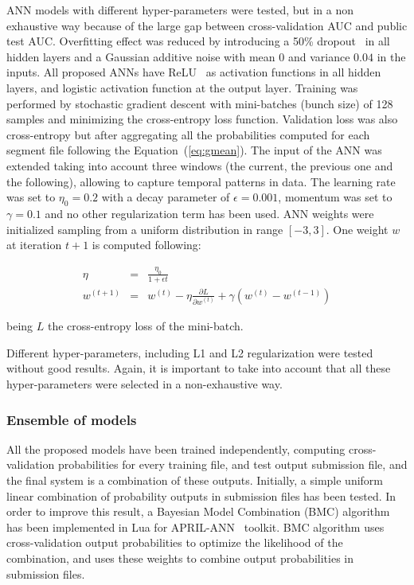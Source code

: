 \documentclass[a4paper,english,twoside]{article}
\begin{document}
ANN models with different hyper-parameters were tested, but in a non exhaustive
way because of the large gap between cross-validation AUC and public test
AUC. Overfitting effect was reduced by introducing a 50\%
dropout~\cite{2012:arxiv:hinton:dropout} in all hidden layers and a Gaussian
additive noise with mean $0$ and variance $0.04$ in the inputs. All proposed
ANNs have ReLU~\cite{2011:glorot:aistats} as activation functions in all hidden
layers, and logistic activation function at the output layer. Training was
performed by stochastic gradient descent with mini-batches (bunch size) of 128
samples and minimizing the cross-entropy loss function. Validation loss was also
cross-entropy but after aggregating all the probabilities computed for each
segment file following the Equation~(\ref{eq:gmean}). The input of the ANN was
extended taking into account three windows (the current, the previous one and
the following), allowing to capture temporal patterns in data. The learning rate
was set to $\eta_0=0.2$ with a decay parameter of $\epsilon=0.001$, momentum was
set to $\gamma=0.1$ and no other regularization term has been used. ANN weights
were initialized sampling from a uniform distribution in range $[-3,3]$. One
weight $w$ at iteration $t+1$ is computed following:

\begin{eqnarray}
\eta &=& \frac{\eta_0}{1 + \epsilon t}\\
w^{(t+1)} &=& w^{(t)} - \eta \frac{\partial L}{\partial w^{(t)}} + \gamma ( w^{(t)} - w^{(t-1)} )
\end{eqnarray}

\noindent being $L$ the cross-entropy loss of the mini-batch.

Different hyper-parameters, including L1 and L2 regularization were tested without
good results. Again, it is important to take into account that all these
hyper-parameters were selected in a non-exhaustive way.

\subsubsection{Ensemble of models}\label{ensemble-of-models}

All the proposed models have been trained independently, computing
cross-validation probabilities for every training file, and test output
submission file, and the final system is a combination of these outputs.
Initially, a simple uniform linear combination of probability outputs in
submission files has been tested. In order to improve this result, a Bayesian
Model Combination (BMC) algorithm~\cite{2011:monteith:ijcnn} has been
implemented in Lua for APRIL-ANN~\cite{aprilann} toolkit. BMC algorithm uses
cross-validation output probabilities to optimize the likelihood of the
combination, and uses these weights to combine output probabilities in
submission files.
\end{document}
